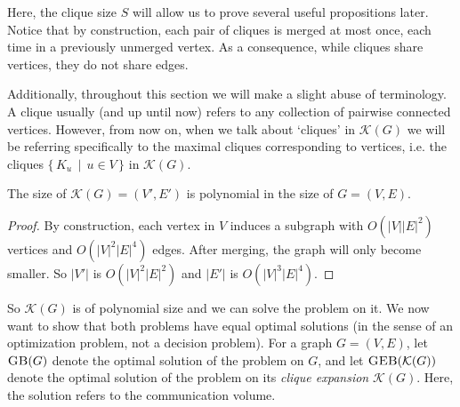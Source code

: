 	Here, the clique size $S$ will allow us to prove several
	useful propositions later. Notice that by construction, each pair of
	cliques is merged at most once, each time in a previously unmerged vertex.
	As a consequence, while cliques share vertices, they do not share edges.

	Additionally, throughout this section we will make a slight abuse of
	terminology. A clique usually (and up until now) refers to any collection
	of pairwise connected vertices. However, from now on, when we talk about
	`cliques' in $\mathcal{K}(G)$ we will be referring specifically to the
	maximal cliques corresponding to vertices, i.e. the cliques
	$\{\, K_u \,\mid\, u \in V \,\}$ in $\mathcal{K}(G)$.

	\begin{proposition}
		\label{poly-size}
		The size of $\mathcal{K}(G) = (V', E')$ is polynomial in the size of
		$G = (V, E)$.
	\end{proposition}
	\begin{proof}
		By construction, each vertex in $V$ induces a subgraph with
		$O(|V||E|^2)$
		vertices and $O(|V|^2|E|^4)$ edges. After merging, the graph will only
		become smaller. So $|V'|$ is $O(|V|^2 |E|^2)$ and $|E'|$ is
		$O(|V|^3|E|^4)$.
	\end{proof}

	So $\mathcal{K}(G)$ is of polynomial size and we can solve the \geb problem
	on it. We now want to show that both problems have equal optimal solutions
	(in the sense of an optimization problem, not a decision problem). For
	a graph $G=(V, E)$, let $\textsc{GB}(G)$ denote the optimal solution of the \gb
	problem on $G$, and let $\textsc{GEB}(\mathcal{K}(G))$ denote the optimal solution
	of the \geb problem on its \textit{clique expansion} $\mathcal{K}(G)$.
	Here, the solution refers to the communication volume.


